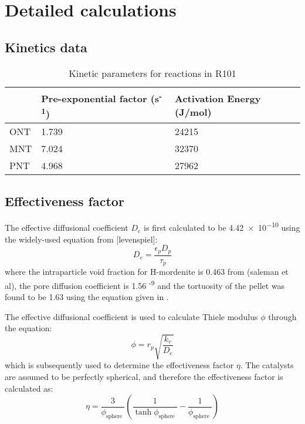 \section{Detailed calculations}
\label{app:reaction}
\subsection{Kinetics data}

\begin{table}[h]
\centering
\caption{Kinetic parameters for reactions in R101}
\label{tab:R1-kinetic-params}
\begin{tabular}{@{}lll@{}}
\toprule
 & Pre-exponential factor (s\textsuperscript{-1}) & Activation Energy (J/mol) \\ \midrule
ONT & 1.739 & 24215 \\
MNT & 7.024 & 32370 \\
PNT & 4.968 & 27962 \\ \bottomrule
\end{tabular}
\end{table}

\subsection{Effectiveness factor}
\label{app:efffactor}
The effective diffusional coefficient $D_e$ is first calculated to be \num{4.42e-10} using the widely-used equation from [levenspiel]: 
\begin{equation}
    D_e = \frac{\epsilon_p D_p}{\tau_p}
\end{equation}
where the intraparticle void fraction for H-mordenite is 0.463 from (saleman et al), the pore diffusion coefficient is 1.56 \textsuperscript{-9} and the tortuosity of the pellet was found to be 1.63 using the equation given in .

The effective diffusional coefficient is used to calculate Thiele modulus $\phi$ through the equation:
\begin{equation}
    \phi = r_p \sqrt{\frac{k_v}{D_e}}
\end{equation}
which is subsequently used to determine the effectiveness factor $\eta$. The catalysts are assumed to be perfectly spherical, and therefore the effectiveness factor is calculated as: 
\begin{equation}
\eta=\frac{3}{\phi_{\text {sphere }}}\left(\frac{1}{\tanh \phi_{\text {sphere }}}-\frac{1}{\phi_{\text {sphere }}}\right)
\end{equation}

